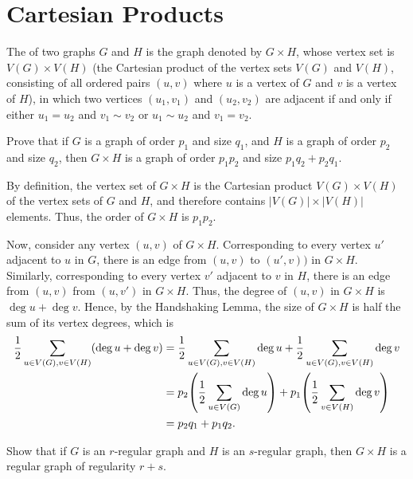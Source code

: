 \section{Cartesian Products}\label{sec:CartProds}

The  of two graphs $G$ and $H$ is the graph denoted by $G \times H$, whose vertex set is $V(G) \times V(H)$ (the Cartesian product of the vertex sets $V(G)$ and $V(H)$, consisting of all ordered pairs $(u, v)$ where $u$ is a vertex of $G$ and $v$ is a vertex of $H$), in which two vertices $(u_1, v_1)$ and $(u_2, v_2)$ are adjacent if and only if either $u_1 = u_2$ and $v_1 \sim v_2$ or $u_1 \sim u_2$ and $v_1 = v_2$.

\begin{Exercise}
Prove that if $G$ is a graph of order $p_1$ and size $q_1$, and $H$ is a graph of order $p_2$ and size $q_2$, then $G \times H$ is a graph of order $p_1 p_2$ and size $p_1 q_2 + p_2 q_1$.
\end{Exercise}

\begin{Solution*}
By definition, the vertex set of $G \times H$ is the Cartesian product $V(G) \times V(H)$ of the vertex sets of $G$ and $H$, and therefore contains $|V(G)| \times |V(H)|$ elements. Thus, the order of $G \times H$ is $p_1 p_2$.

Now, consider any vertex $(u, v)$ of $G \times H$. Corresponding to every vertex $u'$ adjacent to $u$ in $G$, there is an edge from $(u, v)$ to $(u', v))$ in $G \times H$. Similarly, corresponding to every vertex $v'$ adjacent to $v$ in $H$, there is an edge from $(u, v)$ from $(u, v')$ in $G \times H$. Thus, the degree of $(u, v)$ in $G \times H$ is $\deg u + \deg v$. Hence, by the Handshaking Lemma, the size of $G \times H$ is half the sum of its vertex degrees, which is
\begin{align*}
\frac 1 2 \sum_{u \in V(G), v \in V(H)} (\deg u + \deg v) & = \frac 1 2 \sum_{u \in V(G), v \in V(H)} \deg u + \frac 1 2 \sum_{u \in V(G), v \in V(H)} \deg v \\
& = p_2 \pqty{\frac 1 2 \sum_{u \in V(G)} \deg u} + p_1 \pqty{\frac 1 2 \sum_{v \in V(H)} \deg v} \\
& = p_2 q_1 + p_1 q_2.
\end{align*}
\end{Solution*}

\begin{Exercise}
Show that if $G$ is an $r$-regular graph and $H$ is an $s$-regular graph, then $G \times H$ is a regular graph of regularity $r + s$.
\end{Exercise}


